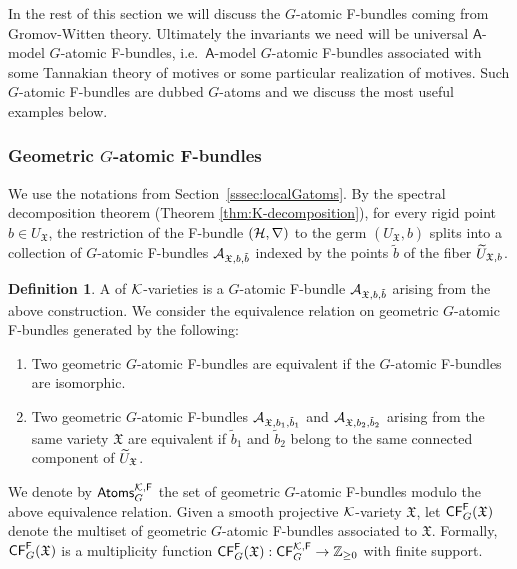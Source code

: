 \documentclass[twoside,leqno]{article}
\numberwithin{equation}{section}
\theoremstyle{plain}
\theoremstyle{definition}
\newtheorem{definition}[equation]{Definition}
\begin{document}
\medskip


In the rest of this section we will discuss the $G$-atomic F-bundles coming from Gromov-Witten theory.  Ultimately the invariants we need will be universal $\mathsf{A}$-model $G$-atomic F-bundles, i.e.\ $\mathsf{A}$-model $G$-atomic F-bundles  associated with some Tannakian theory of motives or some particular realization of motives.  Such $G$-atomic F-bundles are dubbed $G$-atoms and we discuss the most useful examples below. 

\subsubsection{Geometric $G$-atomic F-bundles} 

We use the notations from Section~\ref{sssec:localGatoms}.
By the spectral decomposition theorem (Theorem \ref{thm:K-decomposition}), for every rigid point $b \in U_{\mathfrak{X}}$,  the restriction of the F-bundle $(\mathcal H,\nabla)$ to the germ $(U_{\mathfrak{X}}, b)$ splits into a collection of $G$-atomic F-bundles $\mathcal A_{\mathfrak{X},b,\tilde b}$ indexed by the points $\tilde b$ of the fiber $\widetilde U_{\mathfrak{X},b}$.

\begin{definition} \label{def:G-atom} 
  A  of $\mathcal K$-varieties is a $G$-atomic F-bundle $\mathcal A_{\mathfrak{X},b,\tilde b}$ arising from the above construction.  We consider the equivalence relation on geometric $G$-atomic F-bundles generated by the following:
  \begin{enumerate}
    \item Two geometric $G$-atomic F-bundles are equivalent if the $G$-atomic F-bundles are isomorphic.
    \item Two geometric $G$-atomic F-bundles $\mathcal A_{\mathfrak{X},b_1,\tilde b_1}$ and $\mathcal A_{\mathfrak{X},b_2,\tilde b_2}$ arising from the same variety $\mathfrak{X}$ are equivalent if $\tilde b_1$ and $\tilde b_2$ belong to the same connected component of $\widetilde U_{\mathfrak{X}}$.
  \end{enumerate}
  We denote by $\mathsf{Atoms}_{G}^{\mathcal K,\mathsf{F}}$ the set of geometric $G$-atomic F-bundles modulo the above equivalence relation.
  Given a smooth projective $\mathcal K$-variety $\mathfrak{X}$, let $\mathsf{CF}_G^{\mathsf{F}}(\mathfrak{X})$ denote the multiset of geometric $G$-atomic F-bundles associated to $\mathfrak{X}$.
  Formally, $\mathsf{CF}_G^{\mathsf{F}}(\mathfrak{X})$  is a multiplicity function $
  \mathsf{CF}_G^{\mathsf{F}}(\mathfrak{X}) : \mathsf{CF}_G^{\mathcal K,\mathsf{F}}  \to \mathbb Z_{\geq 0}$ with finite support.
\end{definition}
\end{document}
